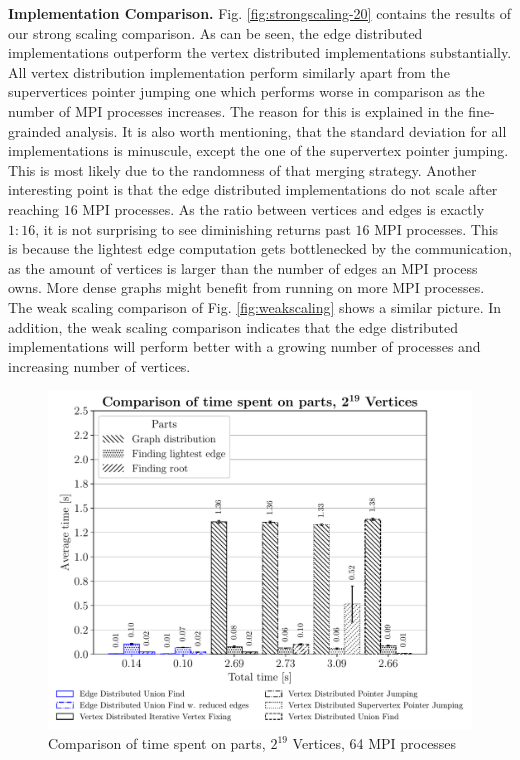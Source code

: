 \documentclass[letterpaper]{article}
\newcommand{\mypar}[1]{{\bf #1.}}
\begin{document}
\mypar{Implementation Comparison}
Fig. \ref{fig:strongscaling-20} contains the results of our strong scaling comparison. As can be seen, the edge
distributed implementations outperform the vertex distributed implementations substantially. All vertex distribution
implementation perform similarly apart from the supervertices pointer jumping one which performs worse in comparison as
the number of MPI processes increases. The reason for this is explained in the fine-grainded analysis. It is also worth
mentioning, that the standard deviation for all implementations is minuscule, except the one of the supervertex pointer
jumping. This is most likely due to the randomness of that merging strategy. Another interesting point is that the edge
distributed implementations do not scale after reaching $16$ MPI processes. As the ratio between vertices and edges is
exactly $1:16$, it is not surprising to see diminishing returns past $16$ MPI processes. This is because the lightest
edge computation gets bottlenecked by the communication, as the amount of vertices is larger than the number of edges
an MPI process owns. More dense graphs might benefit from running on more MPI processes. The weak scaling comparison of
Fig. \ref{fig:weakscaling} shows a similar picture. In addition, the weak scaling comparison indicates that the edge
distributed implementations will perform better with a growing number of processes and increasing number of vertices.

\begin{figure}
  \includegraphics[width=\columnwidth]{../benchmark-results/plots/comparison.pdf}
  \caption{Comparison of time spent on parts, $2^{19}$ Vertices, 64 MPI processes}
  \label{fig:comparison}
\end{figure}
\end{document}
